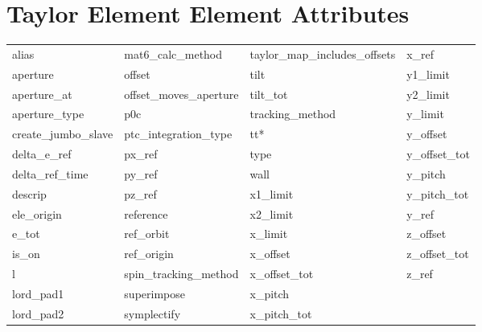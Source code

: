  \vfill
 
 \section{Taylor Element Element Attributes}
 \label{s:list.taylor}
 
 \begin{tabular}{llll} \toprule
alias                       & mat6_calc_method            & taylor_map_includes_offsets & x_ref                       \\
aperture                    & offset                      & tilt                        & y1_limit                    \\
aperture_at                 & offset_moves_aperture       & tilt_tot                    & y2_limit                    \\
aperture_type               & p0c                         & tracking_method             & y_limit                     \\
create_jumbo_slave          & ptc_integration_type        & tt*                         & y_offset                    \\
delta_e_ref                 & px_ref                      & type                        & y_offset_tot                \\
delta_ref_time              & py_ref                      & wall                        & y_pitch                     \\
descrip                     & pz_ref                      & x1_limit                    & y_pitch_tot                 \\
ele_origin                  & reference                   & x2_limit                    & y_ref                       \\
e_tot                       & ref_orbit                   & x_limit                     & z_offset                    \\
is_on                       & ref_origin                  & x_offset                    & z_offset_tot                \\
l                           & spin_tracking_method        & x_offset_tot                & z_ref                       \\
lord_pad1                   & superimpose                 & x_pitch                     &                             \\
lord_pad2                   & symplectify                 & x_pitch_tot                 &                             \\
 \bottomrule
 \end{tabular}
 \vfill
 
